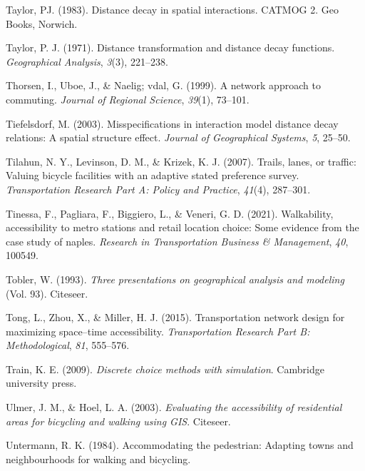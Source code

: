 \documentclass[
11pt, %
oneside, %
english, %
singlespacing, %
]{macthesis} %
\newlength{\cslhangindent}
\newenvironment{CSLReferences}[2] %
{\begin{list}{}{%
	\setlength{\itemindent}{0pt}
	\setlength{\leftmargin}{0pt}
	\setlength{\parsep}{0pt}
	\ifodd #1
	\setlength{\leftmargin}{\cslhangindent}
	\setlength{\itemindent}{-1\cslhangindent}
	\fi
	\setlength{\itemsep}{#2\baselineskip}}}
{\end{list}}
\begin{document}
\begin{CSLReferences}{1}{0}
Taylor, PJ. (1983). Distance decay in spatial interactions. CATMOG 2. Geo Books, Norwich.

Taylor, P. J. (1971). Distance transformation and distance decay functions. \emph{Geographical Analysis}, \emph{3}(3), 221--238.

Thorsen, I., Uboe, J., \& Naelig; vdal, G. (1999). A network approach to commuting. \emph{Journal of Regional Science}, \emph{39}(1), 73--101.

Tiefelsdorf, M. (2003). Misspecifications in interaction model distance decay relations: A spatial structure effect. \emph{Journal of Geographical Systems}, \emph{5}, 25--50.

Tilahun, N. Y., Levinson, D. M., \& Krizek, K. J. (2007). Trails, lanes, or traffic: Valuing bicycle facilities with an adaptive stated preference survey. \emph{Transportation Research Part A: Policy and Practice}, \emph{41}(4), 287--301.

Tinessa, F., Pagliara, F., Biggiero, L., \& Veneri, G. D. (2021). Walkability, accessibility to metro stations and retail location choice: Some evidence from the case study of naples. \emph{Research in Transportation Business \& Management}, \emph{40}, 100549.

Tobler, W. (1993). \emph{Three presentations on geographical analysis and modeling} (Vol. 93). Citeseer.

Tong, L., Zhou, X., \& Miller, H. J. (2015). Transportation network design for maximizing space--time accessibility. \emph{Transportation Research Part B: Methodological}, \emph{81}, 555--576.

Train, K. E. (2009). \emph{Discrete choice methods with simulation}. Cambridge university press.

Ulmer, J. M., \& Hoel, L. A. (2003). \emph{Evaluating the accessibility of residential areas for bicycling and walking using GIS}. Citeseer.

Untermann, R. K. (1984). Accommodating the pedestrian: Adapting towns and neighbourhoods for walking and bicycling.


\end{CSLReferences}
\end{document}
